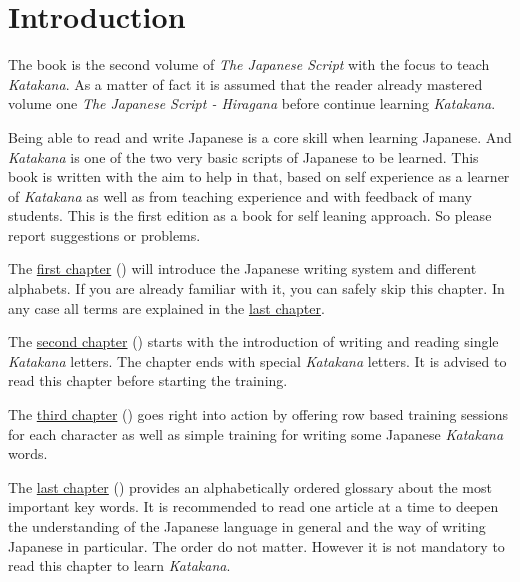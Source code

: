 \chapter*{Introduction}
\label{chap:Introduction}

The book is the second volume of \textit{The Japanese Script} with the focus to
teach \textit{Katakana}. As a matter of fact it is assumed that the reader
already mastered volume one \textit{The Japanese Script - Hiragana} before
continue learning \textit{Katakana}. 

Being able to read and write Japanese is a core skill when learning Japanese.
And \textit{Katakana} is one of the two very basic scripts of Japanese to be
learned.  This book is written with the aim to help in that, based on self
experience as a learner of \textit{Katakana} as well as from teaching
experience and with feedback of many students. This is the first edition as a
book for self leaning approach. So please report suggestions or problems. 

The \hyperref[chap:JapaneseWritingSystem]{first chapter}
() will introduce the Japanese writing
system and different alphabets. If you are already familiar with it, you can
safely skip this chapter. In any case all terms are explained in the
\hyperref[chap:Terminology]{last chapter}.

The \hyperref[chap:TheWayToWriteKatakana]{second chapter}
() starts with the introduction of writing
and reading single \textit{Katakana} letters. The chapter ends with special
\textit{Katakana} letters. It is advised to read this chapter before starting
the training. 

The \hyperref[chap:KatakanaTraining]{third chapter}
() goes right into action by offering row based
training sessions for each character as well as simple training for writing
some Japanese \textit{Katakana} words.

The \hyperref[chap:Terminology]{last chapter} ()
provides an alphabetically ordered glossary about the most important key words.
It is recommended to read one article at a time to deepen the understanding of
the Japanese language in general and the way of writing Japanese in particular.
The order do not matter. However it is not mandatory to read this chapter to
learn\textit{ Katakana}. 

